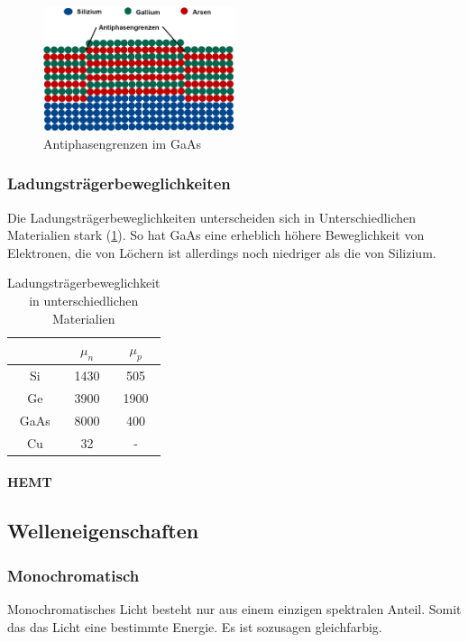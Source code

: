 	\begin{figure}[h]
		\centering
		\includegraphics[width=0.5\textwidth]{Kapitel/Kap11/antiphasen.PNG}
		\caption{Antiphasengrenzen im GaAs}
		\label{11_antiphase}
	\end{figure}
	
	\subsubsection{Ladungsträgerbeweglichkeiten}
	
	Die Ladungsträgerbeweglichkeiten unterscheiden sich in Unterschiedlichen Materialien stark (\ref{11_ladung}). So hat GaAs eine erheblich höhere Beweglichkeit von Elektronen, die von Löchern ist allerdings noch niedriger als die von Silizium. 
	\begin{table}[h]
		\centering
		\begin{tabular}{c|c|c}
			& $\mu_n $ & $\mu_p$ \\
			\hline
			Si & 1430 & 505 \\
			Ge & 3900 & 1900 \\
			GaAs & 8000 & 400 \\
			Cu & 32 & -\\
		\end{tabular}
		\caption{Ladungsträgerbeweglichkeit in unterschiedlichen Materialien}
		\label{11_ladung}
	\end{table}
	\paragraph{HEMT} 
\subsection{Welleneigenschaften}
	\subsubsection{Monochromatisch}
	Monochromatisches Licht besteht nur aus einem einzigen spektralen Anteil. Somit das das Licht eine bestimmte Energie. Es ist sozusagen gleichfarbig.
